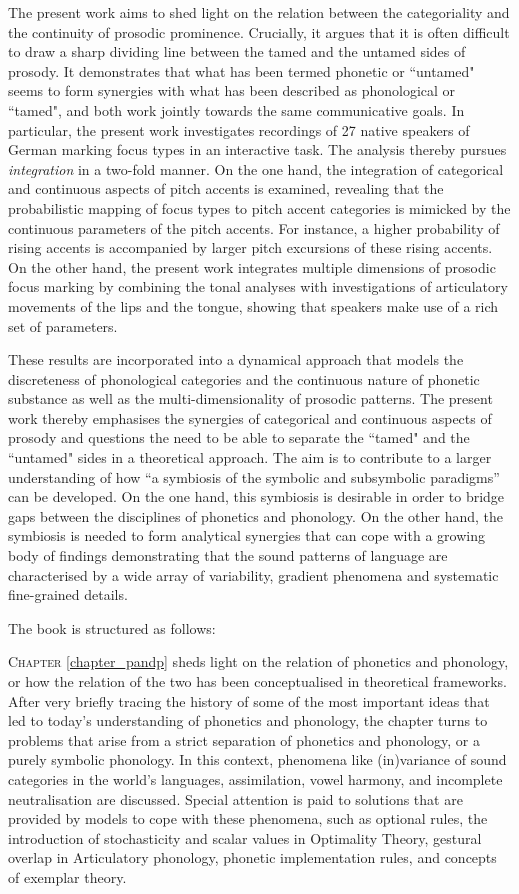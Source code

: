 The present work aims to shed light on the relation between the categoriality and the continuity of prosodic prominence. Crucially, it argues that it is often difficult to draw a sharp dividing line between the tamed and the untamed sides of prosody. It demonstrates that what has been termed phonetic or ``untamed" seems to form synergies with what has been described as phonological or ``tamed", and both work jointly towards the same communicative goals. In particular, the present work investigates recordings of 27 native speakers of German marking focus types in an interactive task. The analysis thereby pursues \emph{integration} in a two-fold manner. On the one hand, the integration of categorical and continuous aspects of pitch accents is examined, revealing that the probabilistic mapping of focus types to pitch accent categories is mimicked by the continuous parameters of the pitch accents. For instance, a higher probability of rising accents is accompanied by larger pitch excursions of these rising accents. On the other hand, the present work integrates multiple dimensions of prosodic focus marking by combining the tonal analyses with investigations of articulatory movements of the lips and the tongue, showing that speakers make use of a rich set of parameters.

These results are incorporated into a dynamical approach that models the discreteness of phonological categories and the continuous nature of phonetic substance as well as the multi-dimensionality of prosodic patterns. The present work thereby emphasises the synergies of categorical and continuous aspects of prosody and questions the need to be able to separate the ``tamed" and the ``untamed" sides in a theoretical approach. The aim is to contribute to a larger understanding of how ``a symbiosis of the symbolic and subsymbolic paradigms” \citep[19]{Smolensky1988} can be developed. On the one hand, this symbiosis is desirable in order to bridge gaps between the disciplines of phonetics and phonology. On the other hand, the symbiosis is needed to form analytical synergies that can cope with a growing body of findings  demonstrating that the sound patterns of language are characterised by a wide array of variability, gradient phenomena and systematic fine-grained details.

The book is structured as follows:


\textsc{Chapter} \ref{chapter_pandp} sheds light on the relation of phonetics and phonology, or how the relation of the two has been conceptualised in theoretical frameworks. After very briefly tracing the history of some of the most important ideas that led to today's understanding of phonetics and phonology, the chapter turns to problems that arise from a strict separation of phonetics and phonology, or a purely symbolic phonology. In this context, phenomena like (in)variance of sound categories in the world's languages, assimilation, vowel harmony, and incomplete neutralisation are discussed. Special attention is paid to solutions that are provided by models to cope with these phenomena, such as optional rules, the introduction of stochasticity and scalar values in Optimality Theory, gestural overlap in Articulatory phonology, phonetic implementation rules, and concepts of exemplar\largerpage{} theory. 

